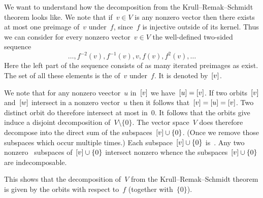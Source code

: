 \documentclass[a4paper, 11pt, twoside=semi]{scrartcl}
\begin{document}
We want to understand how the decomposition from the Krull--Remak--Schmidt theorem looks like.
We note that if~$v \in V$ is any nonzero vector then there exists at most one preimage of~$v$ under~$f$, since~$f$ is injective outside of its kernel.
Thus we can consider for every nonzero vector~$v \in V$ the well-defined two-sided sequence
\[
  \dotsc, f^{-2}(v), f^{-1}(v), v, f(v), f^2(v), \dotsc
\]
Here the left part of the sequence consists of as many iterated preimages as exist.
The set of all these elements is the  of~$v$ under~$f$.
It is denoted by~$[v]$.

We note that for any nonzero veector~$u$ in~$[v]$ we have~$[u] = [v]$.
If two orbits~$[v]$ and~$[w]$ intersect in a nonzero vector~$u$ then it follows that~$[v] = [u] = [v]$.
Two distinct orbit do therefore intersect at most in~$0$.
It follows that the orbits give induce a disjoint decomposition of~$V \setminus \{0\}$.
The vector space~$V$ does therefore decompose into the direct sum of the subspaces~$[v] \cup \{ 0 \}$.
(Once we remove those subspaces which occur multiple times.)
Each subspace~$[v] \cup \{ 0 \}$ is~.
Any two nonzero~ subspaces of~$[v] \cup \{ 0 \}$ intersect nonzero whence the subspaces~$[v] \cup \{ 0 \}$ are indecomposable.

This shows that the decomposition of~$V$ from the Krull--Remak--Schmidt theorem is given by the orbits with respect to~$f$ (together with~$\{ 0 \}$).
\end{document}

